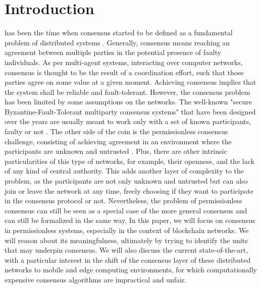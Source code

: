 \documentclass[journal]{IEEEtran}
\begin{document}
\section{Introduction}
% 
% 
% 
% 
 has been the time when consensus started 
to be defined as a fundamental problem of distributed systems \cite{pease1980reaching, lamport2019byzantine, lamport1983weak}. 
Generally, consensus means reaching an agreement between multiple parties 
in the potential presence of faulty individuals. As per multi-agent systems, 
interacting over computer networks, consensus is thought to be the result 
of a coordination effort, such that those parties agree on some value at a 
given moment. Achieving consensus implies that the system shall be reliable 
and fault-tolerant. However, the consensus problem has been limited by some 
assumptions on the networks. The well-known "secure Byzantine-Fault-Tolerant 
multiparty consensus systems" that have been designed over the years are usually 
meant to work only with a set of known participants, faulty or not \cite{castro1999practical}. The 
other side of the coin is the permissionless consensus challenge, consisting of 
achieving agreement in an environment where the participants are unknown and 
untrusted \cite{nakamoto2008bitcoin, buterin2014next}. Plus, there are other intrinsic particularities of 
this type of networks, for example, their openness, and the lack of any kind of central 
authority. This adds another layer of complexity to the problem, as the participants 
are not only unknown and untrusted but can also join or leave the network at any time, 
freely choosing if they want to participate in the consensus protocol or not. Nevertheless, 
the problem of permissionless consensus can still be seen as a special case of the more 
general consensus and can still be formalized in the same way. In this paper, we will 
focus on consensus in permissionless systems, especially in the context of blockchain 
networks. We will reason about its meaningfulness, ultimately by trying to identify the units that 
may underpin consensus. We will also discuss the current state-of-the-art, with a 
particular interest in the shift of the consensus layer of these distributed networks 
to mobile and edge computing environments, for which computationally expensive consensus 
algorithms are impractical and unfair.
\end{document}
